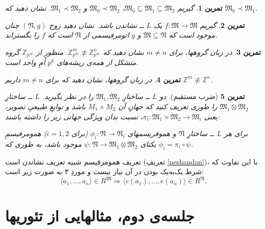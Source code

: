 \documentclass[12pt,a4paper]{report}
\theoremstyle{colorhead}
\newtheorem{tam}{تمرین}
\begin{document}
\begin{tam}
گیریم 
$\mathfrak{M}_0\subseteq \mathfrak{M}_1\subseteq \mathfrak{M}_2$،
$\mathfrak{M}_0\prec \mathfrak{M}_2$
و
$\mathfrak{M}_1\prec \mathfrak{M}_2$.
نشان دهید که
$\mathfrak{M}_0\prec \mathfrak{M}_1$.
\end{tam}
\begin{tam}
گیریم
$f:\mathfrak{M}\to \mathfrak{M}$
یک 
$L$ ــ
نشاندن باشد. نشان دهید 
زوج 
$(\mathfrak{N},g)$
چنان موجود است که
$\mathfrak{M}\subseteq \mathfrak{N}$
و
$g$
اتومرفیسمی از
$\mathfrak{N}$
است که
$f$
را بگستراند.
\end{tam}
\begin{tam}
در زبان گروهها،
برای
$m\not=n$
نشان دهید که
$\mathbb{Z}^m_{p^\infty }\not\equiv \mathbb{Z}^n_{p^\infty }$.
منظور از
$\mathbb{Z}_{p^\infty }$
گروه متشکل از همه‌ی ریشه‌های
$p^k$
اُمِ واحد است.
\end{tam}
\begin{tam}
در زبان گروهها، نشان دهید که برای
$m\not=n$
داریم
$\mathbb{Z}^m\not\equiv\mathbb{Z}^n$.
\end{tam}
\begin{tam}[ضرب مستقیم]
دو
$L$ ــ
ساختارِ
$\mathfrak{M}_1,\mathfrak{M}_2$
را در نظر بگیرید. 
$L$
ــ ساختارِ
$\mathfrak{M}_1\otimes \mathfrak{M}_2$
را طوری تعریف کنید که جهانِ آن
$M_1\times M_2$
باشد و توابعِ طبیعیِ تصویر، یعنی
$\pi_i:\mathfrak{M}_1\times \mathfrak{M}_2\to \mathfrak{M}_i$،
نسبت بدان
ویژگی جهانی زیر را داشته باشند:
\par 
برای هر
$L$ ــ
ساختارِ
$\mathfrak{N}$
و هموفریسمهای
$\phi_i:\mathfrak{N}\to \mathfrak{N}_i$
(برای
$i=1,2$)
همومرفیسمِ یکتای
$\psi:\mathfrak{N}\to \mathfrak{M}_1\otimes \mathfrak{M}_2$
موجود باشد، به طوری که
$\phi_i=\pi_i\circ \psi$.
\end{tam}
تعریف همومرفیسم شبیه تعریف نشاندن است (تعریفِ
\ref{neshandan})،‌
 با این تفاوت که شرط یک‌به‌یک بودن در آن نیاز نیست و 
موردِ ۳ به صورت زیر است: 
\[
\langle a_1,\ldots,a_n\rangle\in R^\mathfrak{M} \Rightarrow 
\langle e(a_1),\ldots,e(a_n)\rangle\in R^\mathfrak{N}.
\]
\pagebreak
\section{ جلسه‌ی دوم، مثالهایی از تئوریها}
\end{document}
